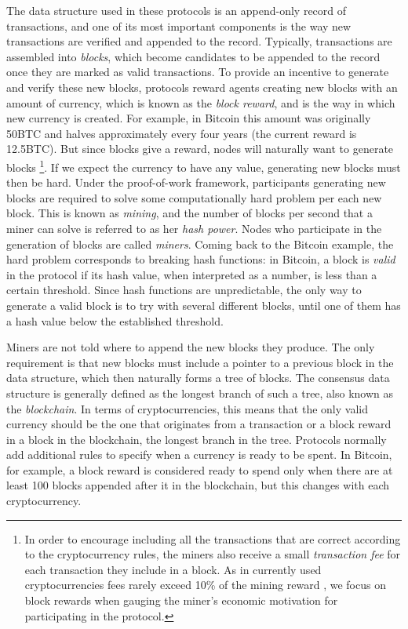 The data structure used in these protocols is an append-only record of transactions, and one of its most important components is the way new transactions 
are  verified and appended to the record. Typically, transactions are assembled into \emph{blocks}, which become candidates to be appended to the record once they are 
marked as valid transactions. 
To provide an incentive to generate and verify these new blocks, protocols reward agents creating new blocks with an amount of currency, which is known as the \emph{block reward}, and is the way in which new currency is created. For example, in Bitcoin this amount was originally 50BTC and halves approximately every four years (the current reward is 12.5BTC). 
But since blocks give a reward, nodes will naturally want to generate blocks \footnote{In order to encourage including all the transactions that are correct according to the cryptocurrency rules, the miners also receive a small {\em transaction fee} for each transaction they include in a block. As in currently used cryptocurrencies fees rarely exceed 10\% of the mining reward \cite{TotalMiningRevenue,TotalMiningFees}, we focus on block rewards when gauging the miner's economic motivation for participating in the protocol.}. If we expect the currency to have any value, generating new blocks must then be hard. Under the proof-of-work framework, participants generating new blocks are required to solve some computationally hard problem per each new block.  This is known as \emph{mining}, and the number of blocks per second that a miner can solve is referred to as her \emph{hash power}. Nodes who participate in the generation of blocks are called \emph{miners}. Coming back to the Bitcoin example, the hard problem corresponds to breaking hash functions: 
in Bitcoin, a block is \emph{valid} in the protocol if its hash value, when interpreted as a number, is less than a certain threshold. Since hash functions are unpredictable, the only way to generate a valid block is to try with several different blocks, until one of them has a hash value below the established threshold. 



Miners are not told where to append the new blocks they produce. The only requirement is that new blocks must include a pointer to a previous block in the data structure, 
which then naturally forms a tree of blocks. The consensus data structure is generally defined as the longest branch of such a tree, also known as the \emph{blockchain}. 
In terms of cryptocurrencies, this means that the only valid currency should be the one that originates from a transaction or a block reward in a block in the blockchain, the longest branch in the tree. Protocols normally add additional rules to specify when a currency is ready to be spent. In Bitcoin, for example, a block reward is considered ready to spend only when there are 
at least 100 blocks appended after it in the blockchain, but this changes with each cryptocurrency.

